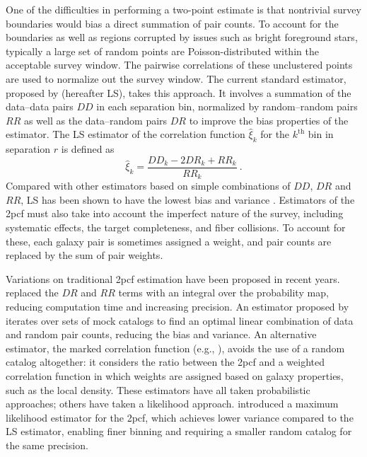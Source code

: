 \documentclass[modern]{aastex62}
\newcommand{\cf}{2pcf\xspace} %
\newcommand{\LS}{LS\xspace}
\begin{document}
One of the difficulties in performing a two-point estimate is that nontrivial survey boundaries would bias a direct summation of pair counts.
To account for the boundaries as well as regions corrupted by issues such as bright foreground stars, typically a large set of random points are Poisson-distributed within the acceptable survey window.
The pairwise correlations of these unclustered points are used to normalize out the survey window.
The current standard estimator, proposed by \cite{LandySzalay1993} (hereafter \LS), takes this approach.
It involves a summation of the data--data pairs $DD$ in each separation bin, normalized by random--random pairs $RR$ as well as the data--random pairs $DR$ to improve the bias properties of the estimator.
The \LS estimator of the correlation function $\hat{\xi}_k$ for the $k^\mathrm{th}$ bin in separation $r$ is defined as
\begin{equation} \label{eq:lsintro}
\hat{\xi}_k = \frac{DD_k - 2DR_k + RR_k}{RR_k} ~.
\end{equation}
Compared with other estimators based on simple combinations of $DD$, $DR$ and $RR$, \LS has been shown to have the lowest bias and variance \citep{Kerscher2000}.
Estimators of the \cf must also take into account the imperfect nature of the survey, including systematic effects, the target completeness, and fiber collisions.
To account for these, each galaxy pair is sometimes assigned a weight, and pair counts are replaced by the sum of pair weights.

Variations on traditional \cf estimation have been proposed in recent years.
\cite{Demina2016} replaced the $DR$ and $RR$ terms with an integral over the probability map, reducing computation time and increasing precision.
An estimator proposed by \cite{VargasMagana2013} iterates over sets of mock catalogs to find an optimal linear combination of data and random pair counts, reducing the bias and variance.
An alternative estimator, the marked correlation function (e.g., \citealt{WhitePadmanabhan2009}), avoids the use of a random catalog altogether: it considers the ratio between the \cf and a weighted correlation function in which weights are assigned based on galaxy properties, such as the local density.
These estimators have all taken probabilistic approaches; others have taken a likelihood approach.
\cite{BaxterRozo2013} introduced a maximum likelihood estimator for the \cf, which achieves lower variance compared to the \LS estimator, enabling finer binning and requiring a smaller random catalog for the same precision.
\end{document}
